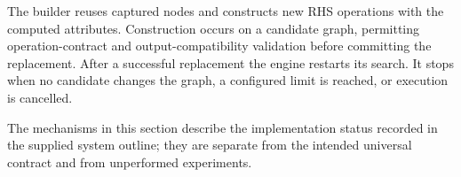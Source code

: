 The builder reuses captured nodes and constructs new RHS operations with
the computed attributes. Construction occurs on a candidate graph, permitting
operation-contract and output-compatibility validation before committing
the replacement. After a successful replacement the engine restarts its
search. It stops when no candidate changes the graph, a configured limit
is reached, or execution is cancelled.

The mechanisms in this section describe the implementation status recorded
in the supplied system outline; they are separate from the intended universal
contract and from unperformed experiments. 
